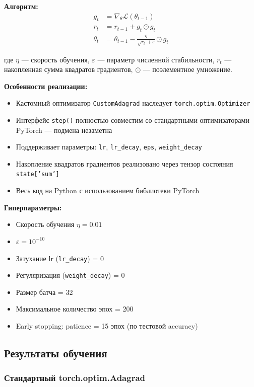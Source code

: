 \textbf{Алгоритм:}
$$
\begin{aligned}
g_t &= \nabla_\theta \mathcal{L}(\theta_{t-1}) \\
r_t &= r_{t-1} + g_t \odot g_t \\
\theta_t &= \theta_{t-1} - \frac{\eta}{\sqrt{r_t} + \varepsilon} \odot g_t
\end{aligned}
$$

где $\eta$ — скорость обучения, $\varepsilon$ — параметр численной стабильности,
$r_t$ — накопленная сумма квадратов градиентов, $\odot$ — поэлементное умножение.

\textbf{Особенности реализации:}
\begin{itemize}
    \item Кастомный оптимизатор \texttt{CustomAdagrad} наследует
          \texttt{torch.optim.Optimizer}
    \item Интерфейс \texttt{step()} полностью совместим со стандартными
          оптимизаторами PyTorch — подмена незаметна
    \item Поддерживает параметры: \texttt{lr}, \texttt{lr\_decay}, \texttt{eps},
          \texttt{weight\_decay}
    \item Накопление квадратов градиентов реализовано через тензор состояния
          \texttt{state['sum']}
    \item Весь код на Python с использованием библиотеки PyTorch
\end{itemize}

\textbf{Гиперпараметры:}
\begin{itemize}
    \item Скорость обучения $\eta = 0.01$
    \item $\varepsilon = 10^{-10}$
    \item Затухание lr (\texttt{lr\_decay}) = 0
    \item Регуляризация (\texttt{weight\_decay}) = 0
    \item Размер батча = 32
    \item Максимальное количество эпох = 200
    \item Early stopping: patience = 15 эпох (по тестовой accuracy)
\end{itemize}

\subsection{Результаты обучения}

\subsubsection{Стандартный torch.optim.Adagrad}

